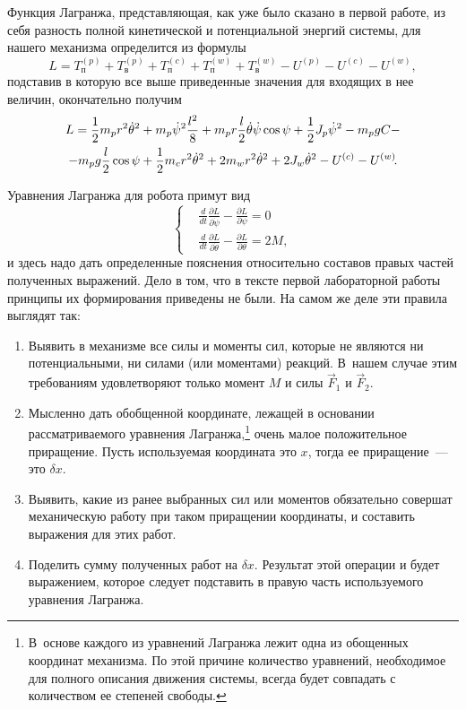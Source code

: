 \documentclass[12pt,a4paper,openany]{extarticle}
\begin{document}
Функция Лагранжа, представляющая, как уже было сказано в первой работе, из себя разность полной кинетической и потенциальной энергий системы,  для нашего механизма определится из формулы
\begin{equation}
	L = T_\textit{п}^{(p)} + T_\textit{в}^{(p)} + T_\textit{п}^{(c)} + T_\textit{п}^{(w)} + T_\textit{в}^{(w)} - U^{(p)} -
		U^{(c)} - U^{(w)}\!,
\end{equation}
подставив в которую все выше приведенные значения для входящих в нее величин, окончательно получим
\begin{multline}
	L = \frac12m_pr^2\dot\theta^2 + m_p\dot\psi^2\frac{l^2}{8} + m_pr\frac l2\dot\theta\dot\psi\cos\psi + \frac12J_p\dot{\psi}^2 
	-m_pgC -\\- m_pg\frac l2\cos\psi + \frac12m_cr^2\dot\theta^2 + 2m_wr^2\dot\theta^2 + 2J_w\dot{\theta}^2 - U^{(c)} - U^{(w)}\!\ldotp
\end{multline}  

Уравнения Лагранжа для робота примут вид
\begin{equation}\label{lagr's_eqs}
	\left\{  
	\begin{aligned}
		\!&\frac{d}{dt}\frac{\partial L}{\partial\dot{\psi}} - \frac{\partial L}{\partial\psi} = 0\\
		\!&\frac{d}{dt}\frac{\partial L}{\partial\dot{\theta}} - \frac{\partial L}{\partial \theta} = 2M,
	\end{aligned}   
	\right.
\end{equation}
и здесь надо дать определенные пояснения относительно составов правых частей полученных выражений. 
Дело в том, что в тексте первой лабораторной работы принципы их формирования приведены не были.
На самом же деле эти правила выглядят так:
\begin{enumerate}
	\item Выявить в механизме все силы и моменты сил, которые не являются ни потенциальными, ни силами (или моментами) реакций. В~нашем случае этим требованиям удовлетворяют только момент $M$ и силы $\vec F_1$ и $\vec F_2$.
	\item Мысленно дать обобщенной координате, лежащей в основании рассматриваемого уравнения Лагранжа\lefteqn,\footnote{В~основе каждого из уравнений Лагранжа лежит одна из обощенных координат механизма. По этой причине количество уравнений, необходимое для полного описания движения системы, всегда будет совпадать с количеством ее степеней свободы.} очень малое положительное приращение. Пусть используемая координата это $x$, тогда ее приращение~--- это $\delta x$.
	\item Выявить, какие из ранее выбранных сил или моментов обязательно совершат механическую работу при таком приращении координаты, и составить выражения для этих работ.
	\item Поделить сумму полученных работ на $\delta x$. Результат этой операции и будет выражением, которое следует подставить в правую часть используемого уравнения Лагранжа.
\end{enumerate}
\end{document}
